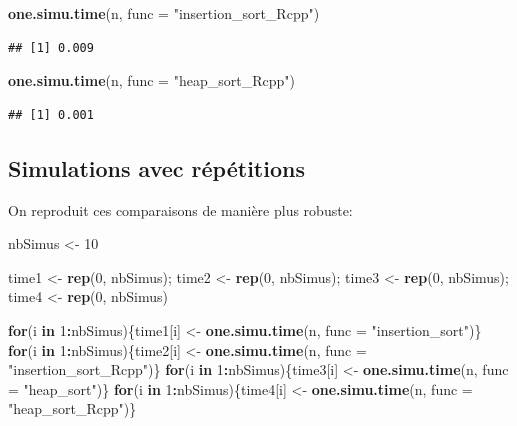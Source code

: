 \documentclass[
]{article}
\newenvironment{Shaded}{\begin{snugshade}}{\end{snugshade}}
\newcommand{\AttributeTok}[1]{\textcolor[rgb]{0.13,0.29,0.53}{#1}}
\newcommand{\ControlFlowTok}[1]{\textcolor[rgb]{0.13,0.29,0.53}{\textbf{#1}}}
\newcommand{\DecValTok}[1]{\textcolor[rgb]{0.00,0.00,0.81}{#1}}
\newcommand{\FunctionTok}[1]{\textcolor[rgb]{0.13,0.29,0.53}{\textbf{#1}}}
\newcommand{\NormalTok}[1]{#1}
\newcommand{\OtherTok}[1]{\textcolor[rgb]{0.56,0.35,0.01}{#1}}
\newcommand{\SpecialCharTok}[1]{\textcolor[rgb]{0.81,0.36,0.00}{\textbf{#1}}}
\newcommand{\StringTok}[1]{\textcolor[rgb]{0.31,0.60,0.02}{#1}}
\begin{document}
\begin{Shaded}
\begin{Highlighting}[]
\FunctionTok{one.simu.time}\NormalTok{(n, }\AttributeTok{func =} \StringTok{"insertion\_sort\_Rcpp"}\NormalTok{)}
\end{Highlighting}
\end{Shaded}

\begin{verbatim}
## [1] 0.009
\end{verbatim}

\begin{Shaded}
\begin{Highlighting}[]
\FunctionTok{one.simu.time}\NormalTok{(n, }\AttributeTok{func =} \StringTok{"heap\_sort\_Rcpp"}\NormalTok{)}
\end{Highlighting}
\end{Shaded}

\begin{verbatim}
## [1] 0.001
\end{verbatim}

\subsection{Simulations avec
répétitions}\label{simulations-avec-ruxe9puxe9titions}

On reproduit ces comparaisons de manière plus robuste:

\begin{Shaded}
\begin{Highlighting}[]
\NormalTok{nbSimus }\OtherTok{\textless{}{-}} \DecValTok{10}

\NormalTok{time1 }\OtherTok{\textless{}{-}} \FunctionTok{rep}\NormalTok{(}\DecValTok{0}\NormalTok{, nbSimus); time2 }\OtherTok{\textless{}{-}} \FunctionTok{rep}\NormalTok{(}\DecValTok{0}\NormalTok{, nbSimus);}
\NormalTok{time3 }\OtherTok{\textless{}{-}} \FunctionTok{rep}\NormalTok{(}\DecValTok{0}\NormalTok{, nbSimus); time4 }\OtherTok{\textless{}{-}} \FunctionTok{rep}\NormalTok{(}\DecValTok{0}\NormalTok{, nbSimus)}

\ControlFlowTok{for}\NormalTok{(i }\ControlFlowTok{in} \DecValTok{1}\SpecialCharTok{:}\NormalTok{nbSimus)\{time1[i] }\OtherTok{\textless{}{-}} \FunctionTok{one.simu.time}\NormalTok{(n, }\AttributeTok{func =} \StringTok{"insertion\_sort"}\NormalTok{)\}}
\ControlFlowTok{for}\NormalTok{(i }\ControlFlowTok{in} \DecValTok{1}\SpecialCharTok{:}\NormalTok{nbSimus)\{time2[i] }\OtherTok{\textless{}{-}} \FunctionTok{one.simu.time}\NormalTok{(n, }\AttributeTok{func =} \StringTok{"insertion\_sort\_Rcpp"}\NormalTok{)\}}
\ControlFlowTok{for}\NormalTok{(i }\ControlFlowTok{in} \DecValTok{1}\SpecialCharTok{:}\NormalTok{nbSimus)\{time3[i] }\OtherTok{\textless{}{-}} \FunctionTok{one.simu.time}\NormalTok{(n, }\AttributeTok{func =} \StringTok{"heap\_sort"}\NormalTok{)\}}
\ControlFlowTok{for}\NormalTok{(i }\ControlFlowTok{in} \DecValTok{1}\SpecialCharTok{:}\NormalTok{nbSimus)\{time4[i] }\OtherTok{\textless{}{-}} \FunctionTok{one.simu.time}\NormalTok{(n, }\AttributeTok{func =} \StringTok{"heap\_sort\_Rcpp"}\NormalTok{)\}}
\end{Highlighting}
\end{Shaded}
\end{document}
